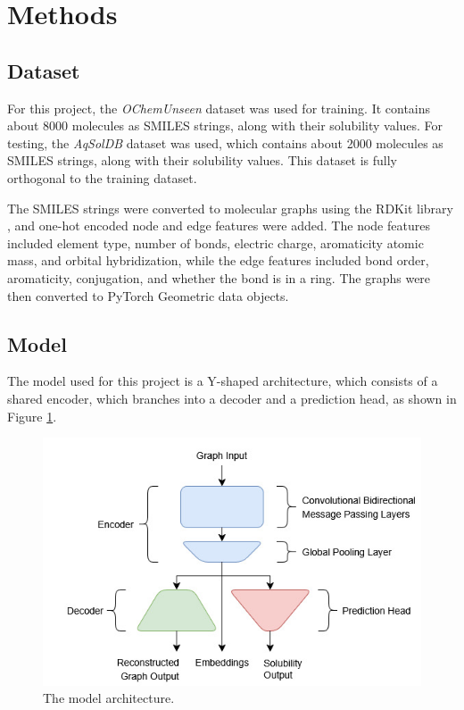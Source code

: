 \documentclass[11pt,a4paper]{article}
\begin{document}
\section{Methods}
\subsection{Dataset}

For this project, the \textit{OChemUnseen} dataset \cite{llompart2024will} was used for training. It contains about 8000 molecules as SMILES strings, along with their solubility values. For testing, the \textit{AqSolDB} dataset \cite{sorkun2019aqsoldb} was used, which contains about 2000 molecules as SMILES strings, along with their solubility values. This dataset is fully orthogonal to the training dataset.

The SMILES strings were converted to molecular graphs using the RDKit library \cite{rdkit}, and one-hot encoded node and edge features were added. The node features included element type, number of bonds, electric charge, aromaticity atomic mass, and orbital hybridization, while the edge features included bond order, aromaticity, conjugation, and whether the bond is in a ring. The graphs were then converted to PyTorch Geometric data objects.

\subsection{Model}

The model used for this project is a Y-shaped architecture, which consists of a shared encoder, which branches into a decoder and a prediction head, as shown in Figure \ref{fig:model}.

\begin{figure}[htbp]
        \centering
        \includegraphics[width=1\textwidth]{model.jpg}
        \caption{The model architecture.}
        \label{fig:model}
\end{figure}
\end{document}
